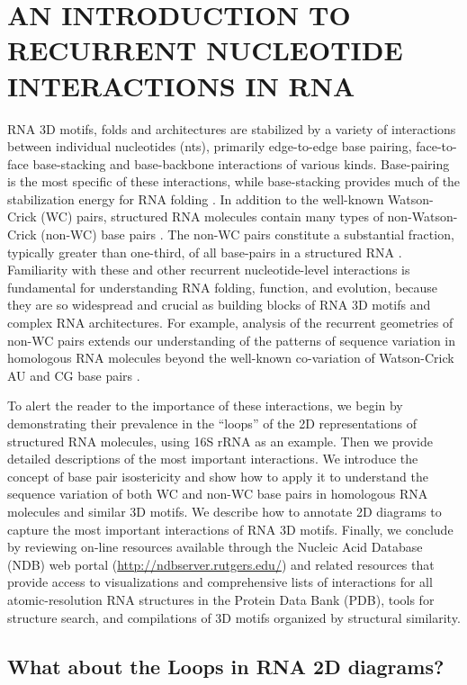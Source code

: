 \chapter{AN INTRODUCTION TO RECURRENT NUCLEOTIDE INTERACTIONS IN RNA}

RNA 3D motifs, folds and architectures are stabilized by a variety of
interactions between individual nucleotides (nts), primarily edge-to-edge base
pairing, face-to-face base-stacking and base-backbone interactions of various
kinds. Base-pairing is the most specific of these interactions, while
base-stacking provides much of the stabilization energy for RNA folding
\cite{Sponer2013}. In addition to the well-known Watson-Crick (WC) pairs,
structured RNA molecules contain many types of non-Watson-Crick (non-WC) base
pairs \cite{Leontis2001}. The non-WC pairs constitute a substantial fraction,
typically greater than one-third, of all base-pairs in a structured RNA
\cite{Stombaugh2009}. Familiarity with these and other recurrent
nucleotide-level interactions is fundamental for understanding RNA folding,
function, and evolution, because they are so widespread and crucial as building
blocks of RNA 3D motifs and complex RNA architectures. For example, analysis of
the recurrent geometries of non-WC pairs extends our understanding of the
patterns of sequence variation in homologous RNA molecules beyond the well-known
co-variation of Watson-Crick AU and CG base pairs \cite{Dutheil2010b,
Leontis2002f}.

To alert the reader to the importance of these interactions, we begin by
demonstrating their prevalence in the ``loops'' of the 2D representations of
structured RNA molecules, using \EC{} 16S rRNA as an example. Then we provide
detailed descriptions of the most important interactions. We introduce the
concept of base pair isostericity and show how to apply it to understand the
sequence variation of both WC and non-WC base pairs in homologous RNA molecules
and similar 3D motifs. We describe how to annotate 2D diagrams to capture the
most important interactions of RNA 3D motifs. Finally, we conclude by reviewing
on-line resources available through the Nucleic Acid Database (NDB) web portal
(\url{http://ndbserver.rutgers.edu/}) and related resources that provide access
to visualizations and comprehensive lists of interactions for all
atomic-resolution RNA structures in the Protein Data Bank (PDB), tools for
structure search, and compilations of 3D motifs organized by structural
similarity. 

\section{What about the Loops in RNA 2D diagrams?}

